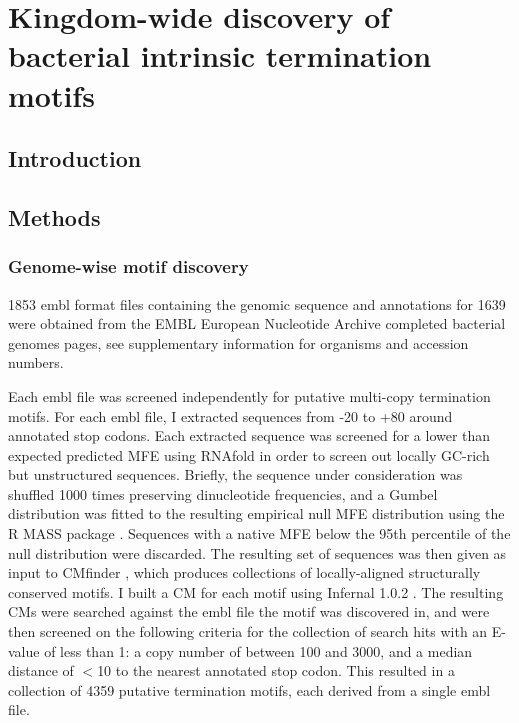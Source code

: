 
\chapter{Kingdom-wide discovery of bacterial intrinsic termination motifs}
\label{sec:chapterPingpong}
\ifpdf
    \graphicspath{{Chapter5/Chapter5Figs/EPS/}{Chapter5/Chapter5Figs/}}
\fi

\section{Introduction}

\section{Methods}

\subsection{Genome-wise motif discovery}
1853 embl format files containing the genomic sequence and annotations for 1639 were obtained from the EMBL European Nucleotide Archive completed bacterial genomes pages, see supplementary information for organisms and accession numbers.

Each embl file was screened independently for putative multi-copy termination motifs. For each embl file, I extracted sequences from -20 to +80 around annotated stop codons. Each extracted sequence was screened for a lower than expected predicted MFE using RNAfold in order to screen out locally GC-rich but unstructured sequences. Briefly, the sequence under consideration was shuffled 1000 times preserving dinucleotide frequencies, and a Gumbel distribution was fitted to the resulting empirical null MFE distribution using the R MASS package \parencite{Venables1994}. Sequences with a native MFE below the 95th percentile of the null distribution were discarded. The resulting set of sequences was then given as input to CMfinder \parencite{Yao2006}, which produces collections of locally-aligned structurally conserved motifs. I built a CM for each motif using Infernal 1.0.2 \parencite{Nawrocki2009}.  The resulting CMs were searched against the embl file the motif was discovered in, and were then screened on the following criteria for the collection of search hits with an E-value of less than 1: a copy number of between 100 and 3000, and a median distance of $<$10 to the nearest annotated stop codon. This resulted in a collection of 4359 putative termination motifs, each derived from a single embl file. 


